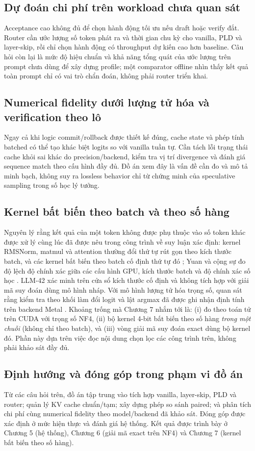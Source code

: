 \subsection{Dự đoán chi phí trên workload chưa quan sát}
Acceptance cao không đủ để chọn hành động tối ưu nếu draft hoặc verify đắt. Router cần ước lượng số token phát ra và thời gian chu kỳ cho vanilla, PLD và layer-skip, rồi chỉ chọn hành động có throughput dự kiến cao hơn baseline. Câu hỏi còn lại là mức độ hiệu chuẩn và khả năng tổng quát của ước lượng trên prompt chưa dùng để xây dựng profile; một comparator offline nhìn thấy kết quả toàn prompt chỉ có vai trò chẩn đoán, không phải router triển khai.

\subsection{Numerical fidelity dưới lượng tử hóa và verification theo lô}
Ngay cả khi logic commit/rollback được thiết kế đúng, cache state và phép tính batched có thể tạo khác biệt logits so với vanilla tuần tự. Cần tách lỗi trạng thái cache khỏi sai khác do precision/backend, kiểm tra vị trí divergence và đánh giá sequence match theo cấu hình đầy đủ. Đồ án xem đây là vấn đề cần đo và mô tả minh bạch, không suy ra lossless behavior chỉ từ chứng minh của speculative sampling trong số học lý tưởng.

\subsection{Kernel bất biến theo batch và theo số hàng}
Nguyên lý rằng kết quả của một token không được phụ thuộc vào số token khác được xử lý cùng lúc đã được nêu trong công trình về suy luận xác định: kernel RMSNorm, matmul và attention thường đổi thứ tự rút gọn theo kích thước batch, và các kernel bất biến theo batch cố định thứ tự đó \cite{he2025defeating}; Yuan và cộng sự đo độ lệch độ chính xác giữa các cấu hình GPU, kích thước batch và độ chính xác số học \cite{yuan2025nondeterminism}. LLM-42 \cite{gond2026llm42} xác minh trên cửa sổ kích thước cố định và không tích hợp với giải mã suy đoán dùng mô hình nháp. Với mô hình lượng tử hóa trọng số, quan sát rằng kiểm tra theo khối làm đổi logit và lật argmax đã được ghi nhận định tính trên backend Metal \cite{chordiya2026lossless}. Khoảng trống mà Chương 7 nhắm tới là: (i) đo theo toán tử trên CUDA với trọng số NF4, (ii) bộ kernel 4-bit bất biến theo số hàng \emph{trong một chuỗi} (không chỉ theo batch), và (iii) vòng giải mã suy đoán exact dùng bộ kernel đó. Phần này dựa trên việc đọc nội dung chọn lọc các công trình trên, không phải khảo sát đầy đủ.

\subsection{Định hướng và đóng góp trong phạm vi đồ án}
Từ các câu hỏi trên, đồ án tập trung vào tích hợp vanilla, layer-skip, PLD và router; quản lý KV cache chuẩn/tạm; xây dựng phép so sánh paired; và phân tích chi phí cùng numerical fidelity theo model/backend đã khảo sát. Đóng góp được xác định ở mức hiện thực và đánh giá hệ thống. Kết quả được trình bày ở Chương 5 (hệ thống), Chương 6 (giải mã exact trên NF4) và Chương 7 (kernel bất biến theo số hàng).
